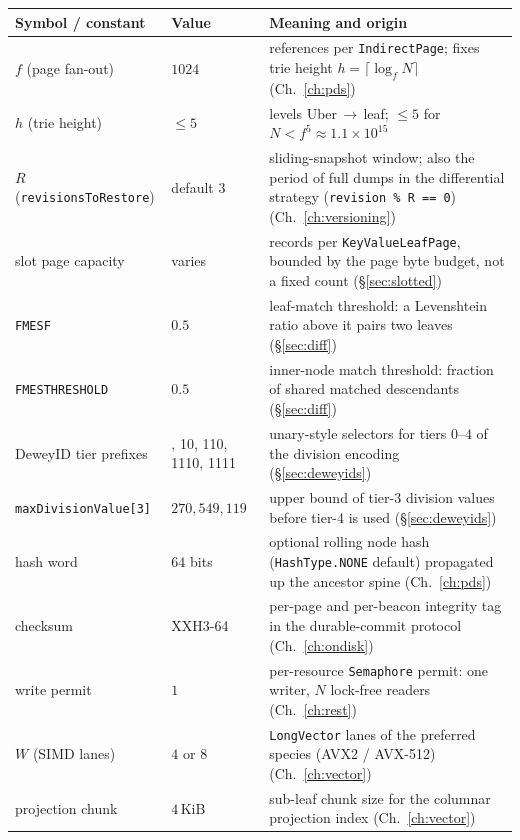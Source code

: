 \documentclass[11pt,a4paper,oneside]{report}
\theoremstyle{sirixthm}
\newcommand{\code}[1]{\texttt{#1}}
\begin{document}
{\small
\begin{xltabular}{\linewidth}{@{}>{\RaggedRight\arraybackslash}p{0.22\textwidth} >{\RaggedRight\arraybackslash}p{0.16\textwidth} >{\RaggedRight\arraybackslash}X@{}}
\toprule
\textbf{Symbol / constant} & \textbf{Value} & \textbf{Meaning and origin}\\
\midrule
\endhead
$f$ (page fan-out) & $1024$ & references per \code{IndirectPage}; fixes trie height $h=\lceil\log_f N\rceil$ (Ch.~\ref{ch:pds})\\
$h$ (trie height) & $\le 5$ & levels Uber\,$\to$\,leaf; $\le 5$ for $N<f^{5}\approx1.1\times10^{15}$\\
$R$ (\code{revisionsToRestore}) & default $3$ & sliding-snapshot window; also the period of full dumps in the differential strategy (\code{revision \% R == 0}) (Ch.~\ref{ch:versioning})\\
slot page capacity & varies & records per \code{KeyValueLeafPage}, bounded by the page byte budget, not a fixed count (\S\ref{sec:slotted})\\
\code{FMESF} & $0.5$ & leaf-match threshold: a Levenshtein ratio above it pairs two leaves (\S\ref{sec:diff})\\
\code{FMESTHRESHOLD} & $0.5$ & inner-node match threshold: fraction of shared matched descendants (\S\ref{sec:diff})\\
DeweyID tier prefixes & 0, 10, 110, 1110, 1111 & unary-style selectors for tiers $0$–$4$ of the division encoding (\S\ref{sec:deweyids})\\
\code{maxDivisionValue[3]} & $270{,}549{,}119$ & upper bound of tier-3 division values before tier-4 is used (\S\ref{sec:deweyids})\\
hash word & $64$ bits & optional rolling node hash (\code{HashType.NONE} default) propagated up the ancestor spine (Ch.~\ref{ch:pds})\\
checksum & XXH3-64 & per-page and per-beacon integrity tag in the durable-commit protocol (Ch.~\ref{ch:ondisk})\\
write permit & $1$ & per-resource \code{Semaphore} permit: one writer, $N$ lock-free readers (Ch.~\ref{ch:rest})\\
$W$ (SIMD lanes) & $4$ or $8$ & \code{LongVector} lanes of the preferred species (AVX2 / AVX-512) (Ch.~\ref{ch:vector})\\
projection chunk & $4$\,KiB & sub-leaf chunk size for the columnar projection index (Ch.~\ref{ch:vector})\\
\bottomrule
\end{xltabular}}
\end{document}
